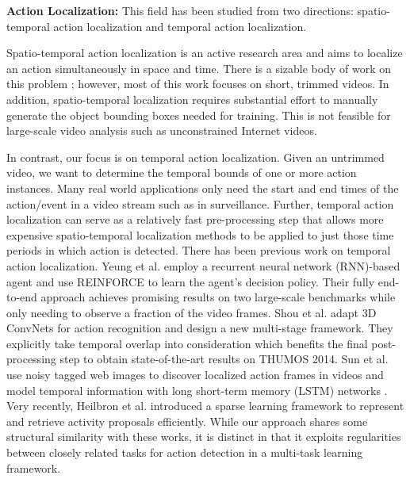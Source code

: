 \documentclass[10pt,twocolumn,letterpaper]{article}
\begin{document}
\noindent \textbf{Action Localization:} This field has been studied from two directions: spatio-temporal action localization and temporal action localization. 

Spatio-temporal action localization is an active research area and aims to localize an action simultaneously in space and time. There is a sizable body of work on this problem \cite{DAP3D2016,15000object2015,Objects2action_Jain_iccv15,actionLocal_context_Soomro_iccv15,actionLocal_track_Weinzaepfel_iccv15,action_tubes_cvpr15_Gkioxari,joint_lan_iccv11}; however, most of this work focuses on short, trimmed videos. In addition, spatio-temporal localization requires substantial effort to manually generate the object bounding boxes needed for training. This is not feasible for large-scale video analysis such as unconstrained Internet videos.

In contrast, our focus is on temporal action localization. Given an untrimmed video, we want to determine the temporal bounds of one or more action instances. Many real world applications only need the start and end times of the action/event in a video stream such as in surveillance. Further, temporal action localization can serve as a relatively fast pre-processing step that allows more expensive spatio-temporal localization methods to be applied to just those time periods in which action is detected. 
There has been previous work on temporal action localization.
Yeung et al. \cite{frame_glimpse_yeung_cvpr16} employ a recurrent neural network (RNN)-based agent and use REINFORCE \cite{REINFORCE_1992} to learn the agent's decision policy. Their fully end-to-end approach achieves promising results on two large-scale benchmarks while only needing to observe a fraction of the video frames.
Shou et al. \cite{scnn_shou_wang_chang_cvpr16} adapt 3D ConvNets \cite{c3d2015} for action recognition and design a new multi-stage framework. 
They explicitly take temporal overlap into consideration which benefits the final post-processing step to obtain state-of-the-art results on THUMOS 2014.
Sun et al. \cite{FGA_web_sun_mm15} use noisy tagged web images to discover localized action frames in videos and model temporal information with long short-term memory (LSTM) networks \cite{LSTM_1997}.
Very recently, Heilbron et al. \cite{fast_temporal_action_proposal_fabian_cvpr16} introduced a sparse learning framework to represent and retrieve activity proposals efficiently. 
While our approach shares some structural similarity with these works, it is distinct in that it exploits regularities between closely related tasks for action detection in a multi-task learning framework.
\end{document}
